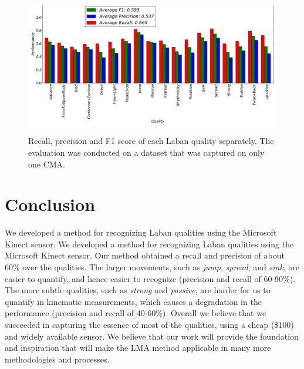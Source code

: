 \documentclass[journal]{journal}
\begin{document}
\begin{figure}
	\centering
	\includegraphics[width=\textwidth, height=60mm]{oneCMAFinalWithoutTitle.png}
	\caption{Recall, precision and F1 score of each Laban quality separately. The
	evaluation was conducted on a dataset that was captured on only one CMA.}
	\label{oneCMAFinal}
\end{figure}

\section{Conclusion}
We developed a method for recognizing Laban qualities using the Microsoft Kinect
sensor. 
We developed a method for recognizing Laban qualities using the Microsoft
Kinect sensor.
Our method obtained a recall and precision of about 60\% over the qualities.
The larger movements, such as \textit{jump}, \textit{spread}, and \textit{sink},
are easier to quantify, and hence  easier to recognize (precision and recall of 60-90\%).
The more subtle qualities, such as \textit{strong} and \textit{passive},
are harder for us to quantify in kinematic measurements, which causes a degradation in
the performance (precision and recall of 40-60\%).
Overall we believe that we succeeded in capturing the essence of most of the qualities,
using a cheap (\$100) and widely available sensor.
We believe that our work will provide the foundation and inspiration that will make the LMA method
applicable in many more methodologies and processes.



\end{document}
